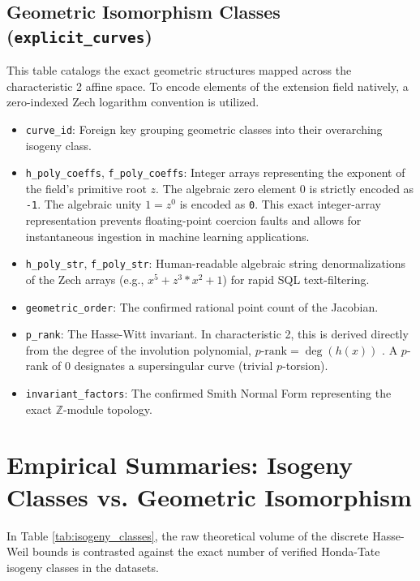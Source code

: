 \documentclass[11pt,letterpaper]{article}
\begin{document}
\subsection{Geometric Isomorphism Classes (\texttt{explicit\_curves})}
This table catalogs the exact geometric structures mapped across the characteristic 2 affine space. To encode elements of the extension field natively, a zero-indexed Zech logarithm convention is utilized.
\begin{itemize}
\item \texttt{curve\_id}: Foreign key grouping geometric classes into their overarching isogeny class.
\item \texttt{h\_poly\_coeffs}, \texttt{f\_poly\_coeffs}: Integer arrays representing the exponent of the field's primitive root $z$. The algebraic zero element $0$ is strictly encoded as \texttt{-1}. The algebraic unity $1 = z^0$ is encoded as \texttt{0}. This exact integer-array representation prevents floating-point coercion faults and allows for instantaneous ingestion in machine learning applications.
\item \texttt{h\_poly\_str}, \texttt{f\_poly\_str}: Human-readable algebraic string denormalizations of the Zech arrays (e.g., $x^5 + z^3*x^2 + 1$) for rapid SQL text-filtering.
\item \texttt{geometric\_order}: The confirmed rational point count of the Jacobian.
\item \texttt{p\_rank}: The Hasse-Witt invariant. In characteristic 2, this is derived directly from the degree of the involution polynomial, $p\text{-rank} = \deg(h(x))$ \cite{Scholten2002, Manin1963}. A $p$-rank of 0 designates a supersingular curve (trivial $p$-torsion).
\item \texttt{invariant\_factors}: The confirmed Smith Normal Form representing the exact $\mathbb{Z}$-module topology.
\end{itemize}

\section{Empirical Summaries: Isogeny Classes vs. Geometric Isomorphism}
In Table \ref{tab:isogeny_classes}, the raw theoretical volume of the discrete Hasse-Weil bounds is contrasted against the exact number of verified Honda-Tate isogeny classes in the datasets.
\end{document}
